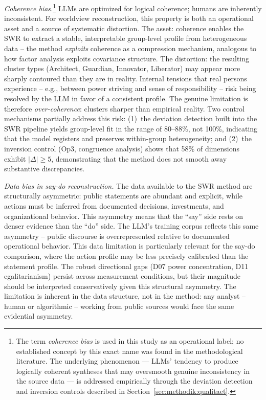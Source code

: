 \documentclass[12pt,a4paper]{article}
\begin{document}
\emph{Coherence bias.}\footnote{The term \emph{coherence bias} is used in this study as an operational label; no established concept by this exact name was found in the methodological literature. The underlying phenomenon --- LLMs' tendency to produce logically coherent syntheses that may oversmooth genuine inconsistency in the source data --- is addressed empirically through the deviation detection and inversion controls described in Section~\ref{sec:methodik:qualitaet}.} LLMs are optimized for logical coherence; humans are inherently inconsistent. For worldview reconstruction, this property is both an operational asset and a source of systematic distortion. The asset: coherence enables the SWR to extract a stable, interpretable group-level profile from heterogeneous data -- the method \emph{exploits} coherence as a compression mechanism, analogous to how factor analysis exploits covariance structure. The distortion: the resulting cluster types (Architect, Guardian, Innovator, Liberator) may appear more sharply contoured than they are in reality. Internal tensions that real persons experience -- e.g., between power striving and sense of responsibility -- risk being resolved by the LLM in favor of a consistent profile. The genuine limitation is therefore \emph{over-coherence}: clusters sharper than empirical reality. Two control mechanisms partially address this risk: (1)~the deviation detection built into the SWR pipeline yields group-level fit in the range of 80--88\%, not 100\%, indicating that the model registers and preserves within-group heterogeneity; and (2)~the inversion control (Op3, congruence analysis) shows that 58\% of dimensions exhibit $|\Delta| \geq 5$, demonstrating that the method does not smooth away substantive discrepancies.

\emph{Data bias in say-do reconstruction.} The data available to the SWR method are structurally asymmetric: public statements are abundant and explicit, while actions must be inferred from documented decisions, investments, and organizational behavior. This asymmetry means that the ``say'' side rests on denser evidence than the ``do'' side. The LLM's training corpus reflects this same asymmetry -- public discourse is overrepresented relative to documented operational behavior. This data limitation is particularly relevant for the say-do comparison, where the action profile may be less precisely calibrated than the statement profile. The robust directional gaps (D07 power concentration, D11 egalitarianism) persist across measurement conditions, but their magnitude should be interpreted conservatively given this structural asymmetry. The limitation is inherent in the data structure, not in the method: any analyst -- human or algorithmic -- working from public sources would face the same evidential asymmetry.
\end{document}
